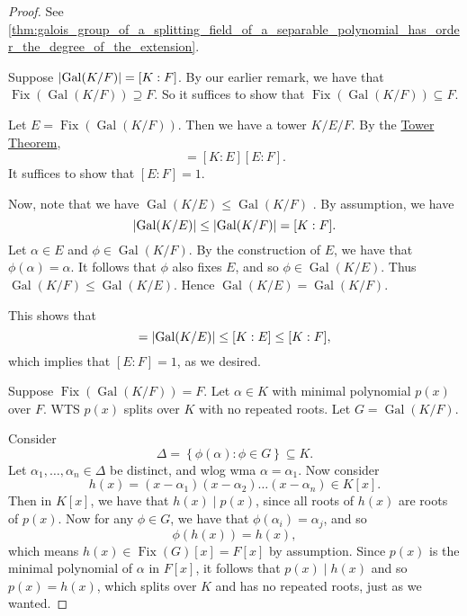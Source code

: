 \documentclass[notoc,notitlepage,nobib]{tufte-book}
\DeclareMathOperator{\Gal}{Gal}
\DeclareMathOperator{\Fix}{Fix}
\begin{document}
\begin{proof}
   See
  \cref{thm:galois_group_of_a_splitting_field_of_a_separable_polynomial_has_order_the_degree_of_the_extension}.

  \noindent
   Suppose $\abs{ \Gal(K / F) } = [ K : F ]$. By
  our earlier remark, we have that $\Fix(\Gal(K / F)) \supseteq F$. So it
  suffices to show that $\Fix(\Gal(K / F)) \subseteq F$.

  Let $E = \Fix(\Gal(K / F))$. Then we have a tower $K / E / F$. By the
  \hyperref[thm:tower_theorem]{Tower Theorem},
  \begin{equation*}
    [K : F] = [K : E][E : F].
  \end{equation*}
  It suffices to show that $[ E : F ] = 1$.
  
  Now, note that we have $\Gal(K / E) \leq \Gal(K / F)$ . By assumption, we have
  \begin{equation*}
    \abs{ \Gal(K / E) } \leq \abs{ \Gal(K / F) } = [K : F].
  \end{equation*}
  Let $\alpha \in E$ and $\phi \in \Gal(K / F)$. By the construction of $E$, we
  have that $\phi(\alpha) = \alpha$. It follows that $\phi$ also fixes $E$, and
  so $\phi \in \Gal(K / E)$. Thus $\Gal(K / F) \leq \Gal(K / E)$. Hence $\Gal(K
  / E) = \Gal(K / F)$.

  This shows that
  \begin{equation*}
    [ K : F ] = \abs{ \Gal(K / E) } \leq [ K : E ] \leq [ K : F ],
  \end{equation*}
  which implies that $[E : F] = 1$, as we desired.

  \noindent
   Suppose $\Fix(\Gal(K / F)) = F$. Let $\alpha \in
  K$ with minimal polynomial $p(x)$ over $F$. WTS $p(x)$ splits over $K$ with
  no repeated roots. Let $G = \Gal(K / F)$.

  Consider 
  \begin{equation*}
    \Delta = \left\{ \phi(\alpha) : \phi \in G \right\} \subseteq K.
  \end{equation*}
  Let $\alpha_1, \ldots, \alpha_n \in \Delta$ be distinct, and wlog wma $\alpha
  = \alpha_1$. Now consider
  \begin{equation*}
    h(x) = (x - \alpha_1)(x - \alpha_2) \hdots (x - \alpha_n) \in K[x].
  \end{equation*}
  Then in $K[x]$, we have that $h(x) \mid p(x)$, since all roots of $h(x)$ are
  roots of $p(x)$. Now for any $\phi \in G$, we have that $\phi(\alpha_i) =
  \alpha_j$, and so
  \begin{equation*}
    \phi(h(x)) = h(x),
  \end{equation*}
  which means $h(x) \in \Fix(G)[x] = F[x]$ by assumption. Since $p(x)$ is the
  minimal polynomial of $\alpha$ in $F[x]$, it follows that $p(x) \mid h(x)$ and
  so $p(x) = h(x)$, which splits over $K$ and has no repeated roots, just as we
  wanted.


\end{proof}
\end{document}
